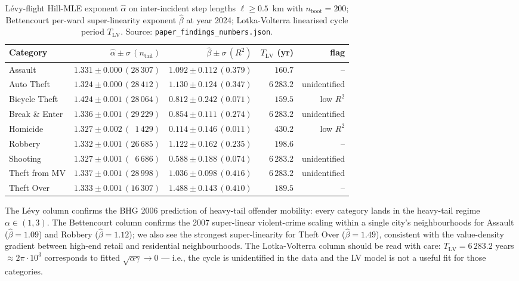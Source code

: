 \documentclass[article,shortnames,nojss]{jss}
\begin{document}
\begin{table}[h]
\centering\footnotesize
\caption{Lévy-flight Hill-MLE exponent $\hat\alpha$ on
inter-incident step lengths $\ell\ge 0.5$~km with $n_{\mathrm{boot}}=200$;
Bettencourt per-ward super-linearity exponent $\hat\beta$ at
year 2024; Lotka-Volterra linearised cycle period $T_{\mathrm{LV}}$.
Source: \texttt{paper\_findings\_numbers.json}.}
\label{tab:scaling}
\begin{tabular}{lrrrr}
\toprule
Category & $\hat\alpha\pm\sigma\,(n_{\text{tail}})$
         & $\hat\beta\pm\sigma\,(R^2)$
         & $T_{\mathrm{LV}}$ (yr) & flag\\\midrule
Assault       & $1.331\pm 0.000\,(28\,307)$ & $1.092\pm 0.112\,(0.379)$ & $\phantom{6\,}160.7$  & --\\
Auto Theft    & $1.324\pm 0.000\,(28\,412)$ & $1.130\pm 0.124\,(0.347)$ & $6\,283.2$ & unidentified\\
Bicycle Theft & $1.424\pm 0.001\,(28\,064)$ & $0.812\pm 0.242\,(0.071)$ & $\phantom{6\,}159.5$  & low $R^2$\\
Break \& Enter& $1.336\pm 0.001\,(29\,229)$ & $0.854\pm 0.111\,(0.274)$ & $6\,283.2$ & unidentified\\
Homicide      & $1.327\pm 0.002\,(\phantom{0}1\,429)$ & $0.114\pm 0.146\,(0.011)$ & $\phantom{6\,}430.2$  & low $R^2$\\
Robbery       & $1.332\pm 0.001\,(26\,685)$ & $1.122\pm 0.162\,(0.235)$ & $\phantom{6\,}198.6$  & --\\
Shooting      & $1.327\pm 0.001\,(\phantom{0}6\,686)$ & $0.588\pm 0.188\,(0.074)$ & $6\,283.2$ & unidentified\\
Theft from MV & $1.337\pm 0.001\,(28\,998)$ & $1.036\pm 0.098\,(0.416)$ & $6\,283.2$ & unidentified\\
Theft Over    & $1.333\pm 0.001\,(16\,307)$ & $1.488\pm 0.143\,(0.410)$ & $\phantom{6\,}189.5$  & --\\
\bottomrule
\end{tabular}
\end{table}

The Lévy column confirms the BHG 2006 \citep{brockmann2006bhg}
prediction of heavy-tail offender mobility: every category lands in
the heavy-tail regime $\alpha \in (1,3)$.  The Bettencourt column
confirms the 2007 \citep{bettencourt2007} super-linear violent-crime
scaling within a single city's neighbourhoods for Assault
($\hat\beta=1.09$) and Robbery ($\hat\beta=1.12$); we also see
the strongest super-linearity for Theft Over ($\hat\beta=1.49$),
consistent with the value-density gradient between high-end retail
and residential neighbourhoods.  The Lotka-Volterra column should be
read with care: $T_{\mathrm{LV}} = 6\,283.2$ years
$\approx 2\pi\cdot 10^3$ corresponds to fitted
$\sqrt{\alpha\gamma} \to 0$ --- i.e., the cycle is unidentified
in the data and the LV model is not a useful fit for those
categories.
\end{document}
